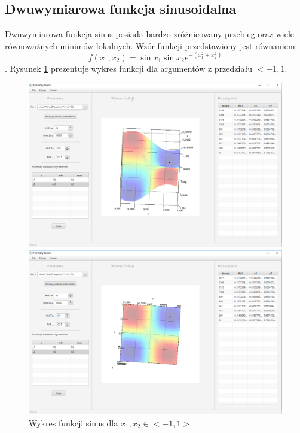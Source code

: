 \documentclass[10pt, a4paper]{article}
\begin{document}
\subsection{Dwuwymiarowa funkcja sinusoidalna}
\label{subsec:sin}
Dwuwymiarowa funkcja sinus posiada bardzo zróżnicowany przebieg oraz wiele równoważnych minimów lokalnych. Wzór funkcji przedstawiony jest równaniem $$f(x_{1},x_{2})=\sin{x_{1}}\sin{x_{2}}e^{-(x_{1}^2+x_{2}^2)}$$. Rysunek \ref{fig:8} prezentuje wykres funkcji dla argumentów z przedziału $<-1,1$.
\begin{figure}[htbp] 
	\begin{minipage}[b]{.5\textwidth}
		\centering
		\includegraphics[width=\linewidth]{images/81.PNG}
	\end{minipage} 
	\begin{minipage}[b]{.5\textwidth}
		\centering
		\includegraphics[width=\linewidth]{images/82.PNG} 
	\end{minipage}
	\label{fig:8}
	\caption{Wykres funkcji sinus dla $x_{1}, x_{2} \in <-1,1>$}
\end{figure}
\end{document}
